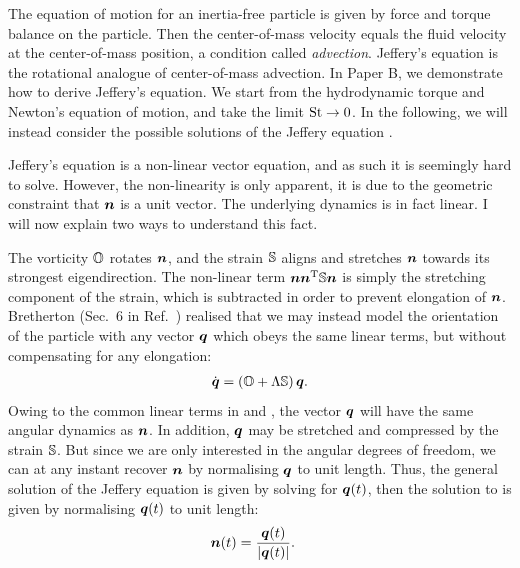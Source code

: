 \documentclass[thesis.tex]{subfiles}
\begin{document}
 The equation of motion for an inertia-free particle is given by force and torque balance on the particle. Then the center-of-mass velocity equals the fluid velocity at the center-of-mass position, a condition called \emph{advection}. Jeffery's equation is the rotational analogue of center-of-mass advection. In Paper B, we demonstrate how to derive Jeffery's equation. We start from the hydrodynamic torque and Newton's equation of motion, and take the limit $\mbox{St}\to 0$. In the following, we will instead consider the possible solutions of the Jeffery equation .

Jeffery's equation is a non-linear vector equation, and as such it is seemingly hard to solve. However, the non-linearity is only apparent, it is due to the geometric constraint that $\mbox{\boldmath$n$}$ is a unit vector. The underlying dynamics is in fact linear. I will now explain two ways to understand this fact.

The vorticity $\mathbb{O}$ rotates $\mbox{\boldmath$n$}$, and the strain $\mathbb{S}$ aligns and stretches $\mbox{\boldmath$n$}$ towards its strongest eigendirection. The non-linear term $\mbox{\boldmath$n$} \mbox{\boldmath$n$}^{\mathrm T} \mathbb{S} \mbox{\boldmath$n$}$ is simply the stretching component of the strain, which is subtracted in order to prevent elongation of $\mbox{\boldmath$n$}$. Bretherton (Sec.~6 in Ref.~\cite{bretherton1962}) realised that we may instead model the orientation of the particle with any vector $\mbox{\boldmath$q$}$ which obeys the same linear terms, but without compensating for any elongation:
\begin{align}
	\dot{\ve q} = \left(\ma O + \Lambda \ma S\right) \ve q.\eqnlab{jefferyq}
\end{align}
Owing to the common linear terms in  and , the vector $\mbox{\boldmath$q$}$ will have the same angular dynamics as $\mbox{\boldmath$n$}$. In addition, $\mbox{\boldmath$q$}$ may be stretched and compressed by the strain $\mathbb{S}$. But since we are only interested in the angular degrees of freedom, we can at any instant recover $\mbox{\boldmath$n$}$ by normalising $\mbox{\boldmath$q$}$ to unit length. Thus, the general solution of the Jeffery equation is given by solving  for $\mbox{\boldmath$q$}(t)$, then the solution to  is given by normalising $\mbox{\boldmath$q$}(t)$ to unit length:
\begin{align}
	\ve n(t) &= \frac{\ve q(t)}{|\ve q(t)|}.\eqnlab{jefferysolution0}
\end{align}
\end{document}
